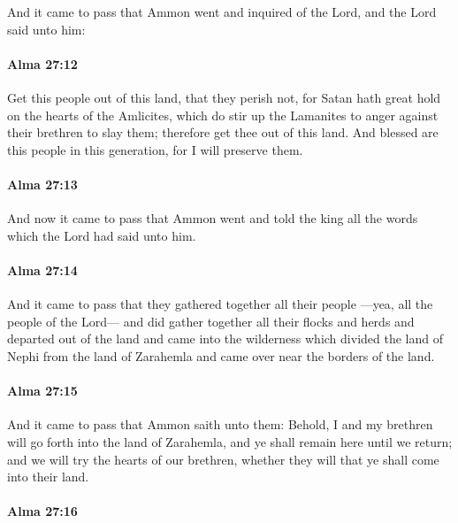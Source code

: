 			And it came to pass that Ammon went and inquired of the Lord,
			and the Lord said unto him:

		\paragraph{Alma 27:12} %
			\label{ALMA-27-12}

			Get this people out of this land, that they perish not,
			for Satan hath great hold on the hearts of the Amlicites,
			which do stir up the Lamanites to anger against their brethren to slay them;
			therefore get thee out of this land.
			And blessed are this people in this generation,
			for I will preserve them.

		\paragraph{Alma 27:13} %
			\label{ALMA-27-13}

			And now it came to pass that Ammon went and told the king
			all the words which the Lord had said unto him.

		\paragraph{Alma 27:14} %
			\label{ALMA-27-14}

			And it came to pass that they gathered together all their people
			---yea, all the people of the Lord---
			and did gather together all their flocks and herds
			and departed out of the land and came into the wilderness
			which divided the land of Nephi from the land of Zarahemla
			and came over near the borders of the land.

		\paragraph{Alma 27:15} %
			\label{ALMA-27-15}

			And it came to pass that Ammon saith unto them:
			Behold, I and my brethren will go forth into the land of Zarahemla,
			and ye shall remain here until we return;
			and we will try the hearts of our brethren,
			whether they will that ye shall come into their land.

		\paragraph{Alma 27:16} %
			\label{ALMA-27-16}

